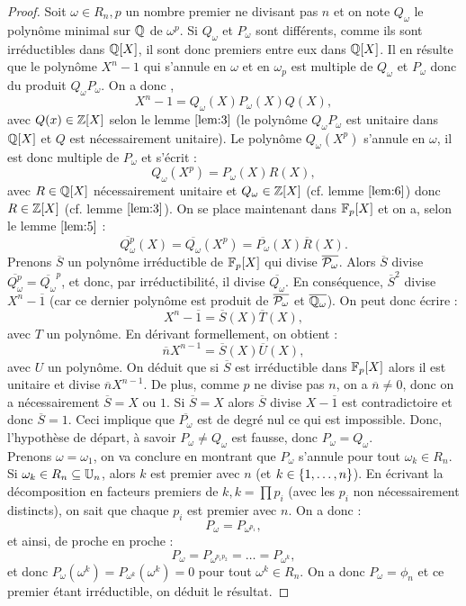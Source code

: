 \begin{proof}
Soit $\omega \in R_n, p$ un nombre premier ne divisant pas $n$ et on note $Q_{\omega}$ le polynôme minimal sur $\Q$
de $\omega^p$. Si $Q_{\omega}$ et $P_{\omega}$ sont différents, comme ils sont irréductibles dans $\Q[X]$, il sont donc premiers
entre eux dans $\Q[X]$. 
Il en résulte que le polynôme $X^n-1$ qui s'annule en $\omega$ et en $\omega_p$ est multiple de $Q_{\omega}$ et $P_{\omega}$ 
donc du produit $Q_{\omega} P_{\omega}$.
On a donc ,
\[ X^n-1 = Q_{\omega}(X) P_{\omega}(X) Q(X) , \]
avec $Q(x) \in \Z[X]$ selon le lemme $\ref{lem:3}$  
(le polynôme $Q_{\omega} P_{\omega}$ est unitaire dans $\Q[X]$ et $Q$ est nécessairement unitaire). 
Le polynôme $Q_{\omega}(X^p)$ s'annule en $\omega$, il est donc multiple de $P_{\omega}$ et s'écrit :
\[ Q_{\omega}(X^p) = P_{\omega}(X) R(X) , \]
avec $R \in \Q[X]$ nécessairement unitaire et $Q_{\omega} \in \Z[X]$ (cf. lemme $\ref{lem:6}$) 
donc $R \in \Z[X]$ (cf. lemme $\ref{lem:3}$).
On se place maintenant dans $\F_p[X]$ et on a, selon le lemme $\ref{lem:5}$ :
\[ \overline{Q_\omega^p}(X) = \overline{Q_{\omega}}(X^p) = \overline{P_{\omega}}(X) \overline{R}(X) . \]
Prenons $\overline{S}$ un polynôme irréductible de $\F_p[X]$ qui divise $\overline{\P_\omega}$. 
Alors $\overline{S}$ divise $\overline{Q_\omega^p} = \overline{Q_\omega}^p$, et donc, par irréductibilité, 
il divise $\overline{Q_\omega}$. En conséquence, $\overline{S}^2$ divise $X^n - \overline{1}$
(car ce dernier polynôme est produit de $\overline{\P_\omega}$ et $\overline{\Q_\omega}$).
On peut donc écrire :
\[  X^n - \overline{1} = \overline{S}(X) \overline{T}(X) , \]
avec $T$ un polynôme. En dérivant formellement, on obtient :
\[ \overline{n} X^{n-1} = \overline{S}(X) \overline{U}(X) , \]
avec $U$ un polynôme. 
On déduit que si $\overline{S}$ est irréductible dans $\F_p[X]$ alors il est unitaire et divise $\overline{n} X^{n-1}$.
De plus, comme $p$ ne divise pas $n$, on a $\overline{n} \neq 0$, donc on a nécessairement $\overline{S} = X$ ou $1$.
Si $\overline{S} = X$ alors $\overline{S}$ divise $X - \overline{1}$ est contradictoire et donc $\overline{S} = 1$.
Ceci implique que $\overline{P_\omega}$ est de degré nul ce qui est impossible.
Donc, l'hypothèse de départ, à savoir $P_\omega \neq Q_\omega$ est fausse, donc $P_\omega = Q_\omega$. \\

Prenons $\omega = \omega_1$, on va conclure en montrant que $P_\omega$ s'annule pour tout $\omega_k \in R_n$. 
Si $\omega_k \in R_n \subset \U_n$, alors $k$ est premier avec $n$ (et $k \in \set{1, \dots, n}$).
En écrivant la décomposition en facteurs premiers de $k, k =\prod p_i$ (avec les $p_i$ non nécessairement distincts),
on sait que chaque $p_i$ est premier avec $n$. On a donc :
\[ P_{\omega} = P_{\omega^{p_1}} , \]
et ainsi, de proche en proche :
\[ P_{\omega} = P_{\omega^{p_1 p_2}} = \dots = P_{\omega^{k}} , \]
et donc $P_{\omega}(\omega^k) =  P_{\omega^{k}}(\omega^k) = 0$ pour tout $\omega^k \in R_n$.
On a donc $P_{\omega} = \phi_n$ et ce premier étant irréductible, on déduit le résultat.
\end{proof}

